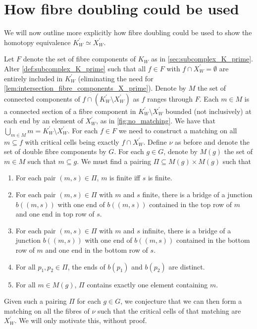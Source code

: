 \documentclass[class=article, crop=false]{standalone}
\begin{document}
\section{How fibre doubling could be used}

We will now outline more explicitly how fibre doubling could be used to show the homotopy equivalence $K^\prime_W \simeq X^\prime_W$.

Let $F$ denote the set of fibre components of $K_W$ as in \cref{sec:subcomplex_K_prime}. Alter \cref{def:subcomplex_K_prime} such that all $f \in F$ with $f \cap X^\prime_W = \emptyset$ are entirely included in $K^\prime_W$ (eliminating the need for \cref{lem:intersection_fibre_components_X_prime}). Denote by $M$ the set of connected components of $f \cap (K^\prime_W \setminus X^\prime_W)$ as $f$ ranges through $F$. Each $m \in M$ is a connected section of a fibre component in $K^\prime_W \setminus X^\prime_W$ bounded (not inclusively) at each end by an element of $X^\prime_W$, as in \cref{fig:no_matching}. We have that $\bigcup_{m \in M}m = K^\prime_W \setminus X^\prime_W$.
For each $f \in F$ we need to construct a matching on all $m \subseteq f$ with critical cells being exactly $f \cap X^\prime_W$. Define $\nu$ as before and denote the set of double fibre components by $G$. For each $g \in G$, denote by $M(g)$ the set of $m \in M$ such that $m \subseteq g$. We must find a pairing $\Pi \subseteq M(g)\times M(g)$ such that
\begin{enumerate}
    \item For each pair $(m,s) \in \Pi$, $m$ is finite iff $s$ is finite.
    \item For each pair $(m,s) \in \Pi$ with $m$ and $s$ finite, there is a bridge of a junction $b((m,s))$ with one end of $b((m,s))$ contained in the top row of $m$ and one end in top row of $s$.
    \item For each pair $(m,s) \in \Pi$ with $m$ and $s$ infinite, there is a bridge of a junction $b((m,s))$ with one end of $b((m,s))$ contained in the bottom row of $m$ and one end in the bottom row of $s$.
    \item For all $p_1,p_2 \in \Pi$, the ends of $b(p_1)$ and $b(p_2)$ are distinct.
    \item For all $m \in M(g)$, $\Pi$ contains exactly one element containing $m$.  
\end{enumerate}
Given such a pairing $\Pi$ for each $g \in G$, we conjecture that we can then form a matching on all the fibres of $\nu$ such that the critical cells of that matching are $X^\prime_W$. We will only motivate this, without proof.
\end{document}
